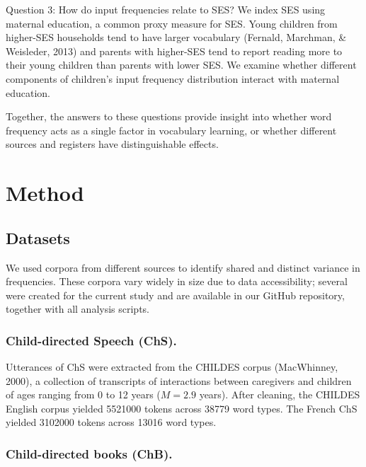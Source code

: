 \documentclass[10pt, letterpaper]{article}
\begin{document}
Question 3: How do input frequencies relate to SES? We index SES using
maternal education, a common proxy measure for SES. Young children from
higher-SES households tend to have larger vocabulary (Fernald, Marchman,
\& Weisleder, 2013) and parents with higher-SES tend to report reading
more to their young children than parents with lower SES. We examine
whether different components of children's input frequency distribution
interact with maternal education.

Together, the answers to these questions provide insight into whether
word frequency acts as a single factor in vocabulary learning, or
whether different sources and registers have distinguishable effects.

\hypertarget{method}{%
\section{Method}\label{method}}

\hypertarget{datasets}{%
\subsection{Datasets}\label{datasets}}

We used corpora from different sources to identify shared and distinct
variance in frequencies. These corpora vary widely in size due to data
accessibility; several were created for the current study and are
available in our GitHub repository, together with all analysis scripts.

\hypertarget{child-directed-speech-chs.}{%
\subsubsection{Child-directed Speech
(ChS).}\label{child-directed-speech-chs.}}

Utterances of ChS were extracted from the CHILDES corpus (MacWhinney,
2000), a collection of transcripts of interactions between caregivers
and children of ages ranging from 0 to 12 years (\(M=2.9\) years). After
cleaning, the CHILDES English corpus yielded 5521000 tokens across 38779
word types. The French ChS yielded 3102000 tokens across 13016 word
types.

\hypertarget{child-directed-books-chb.}{%
\subsubsection{Child-directed books
(ChB).}\label{child-directed-books-chb.}}
\end{document}
